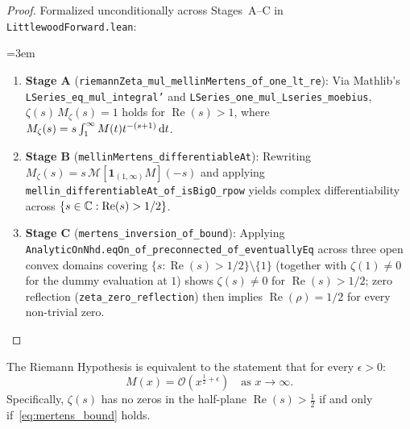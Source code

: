 \begin{proof}
\leanok
Formalized unconditionally across Stages~A--C in \texttt{LittlewoodForward.lean}:
{\raggedright\emergencystretch=3em
\begin{enumerate}
  \item \textbf{Stage A} (\texttt{riemannZeta\_mul\_}\allowbreak\texttt{mellinMertens\_}\allowbreak\texttt{of\_one\_lt\_re}): Via Mathlib's \texttt{LSeries\_}\allowbreak\texttt{eq\_mul\_integral'} and \texttt{LSeries\_}\allowbreak\texttt{one\_mul\_Lseries\_moebius}, $\zeta(s)\, M_\zeta(s) = 1$ holds for $\operatorname{Re}(s) > 1$, where $M_\zeta(s) = s \int_1^\infty M(t) t^{-(s+1)}\,\mathrm{d} t$.
  \item \textbf{Stage B} (\texttt{mellinMertens\_\allowbreak differentiableAt}): Rewriting $M_\zeta(s) = s\,\mathcal{M}[\mathbf{1}_{(1,\infty)} M](-s)$ and applying \texttt{mellin\_differentiableAt\_\allowbreak of\_isBigO\_rpow} yields complex differentiability across $\{s \in \mathbb{C} : \operatorname{Re}(s) > 1/2\}$.
  \item \textbf{Stage C} (\texttt{mertens\_\allowbreak inversion\_\allowbreak of\_\allowbreak bound}): Applying \texttt{AnalyticOnNhd.}\allowbreak\texttt{eqOn\_of\_}\allowbreak\texttt{preconnected\_of\_}\allowbreak\texttt{eventuallyEq} across three open convex domains covering $\{s : \operatorname{Re}(s) > 1/2\} \setminus \{1\}$ (together with $\zeta(1) \neq 0$ for the dummy evaluation at $1$) shows $\zeta(s) \neq 0$ for $\operatorname{Re}(s) > 1/2$; zero reflection (\texttt{zeta\_zero\_reflection}) then implies $\operatorname{Re}(\rho) = 1/2$ for every non-trivial zero.
\end{enumerate}
}
\end{proof}

\begin{theorem}
\label{thm:mertens_riemann_equiv}
\leanok
The Riemann Hypothesis is equivalent to the statement that for every $\epsilon > 0$:
\begin{equation}
\label{eq:mertens_bound}
M(x) = \mathcal{O}\left(x^{\frac{1}{2} + \epsilon}\right) \quad \text{as } x \to \infty.
\end{equation}
Specifically, $\zeta(s)$ has no zeros in the half-plane $\operatorname{Re}(s) > \frac{1}{2}$ if and only if~\eqref{eq:mertens_bound} holds.
\end{theorem}

